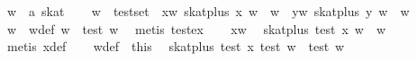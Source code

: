 \begin{isabellebody}
\ w\ {}{}\ {}{}a\ skat{}\isanewline
\ \ \isamarkupfalse%
\ {}w\ {}\ test{}set{}\ \ xw{}\ {}skat{}plus\ x\ w\ {}\ w{}\ \ yw{}\ {}skat{}plus\ y\ w\ {}\ w{}\isanewline
\ \ \isamarkupfalse%
\ \isamarkupfalse%
\ w{}\ \ w{}{}def{}\ {}w\ {}\ test\ w{}{}\ \isamarkupfalse%
\ {}metis\ test{}ex{}\isanewline
\ \ \isamarkupfalse%
\ xw\ \isamarkupfalse%
\ {}skat{}plus\ {}test\ x{}{}\ w\ {}\ w{}\isanewline
\ \ \ \ \isamarkupfalse%
\ {}metis\ x{}{}def{}\isanewline
\ \ \isamarkupfalse%
\ w{}{}def\ \ this\ \isamarkupfalse%
\ {}skat{}plus\ {}test\ x{}{}\ {}test\ w{}{}\ {}\ {}test\ w{}{}{}\isanewline

\end{isabellebody}

